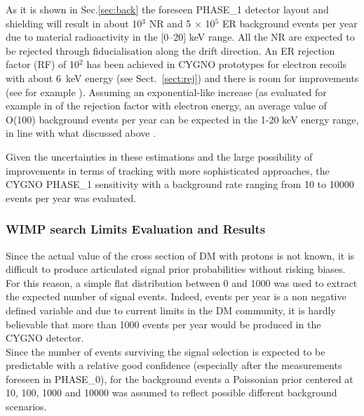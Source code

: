 \documentclass[physics,article,submit,moreauthors,pdftex]{Definitions/mdpi}
\begin{document}
As it is shown in Sec.\ref{sec:back} the foreseen PHASE\_1 detector layout and shielding will result in about 10$^3$ NR and 5 $\times$ 10$^5$ ER background events per year due to material radioactivity in the [0--20] keV range. All the NR are expected to be rejected through fiducialisation along the drift direction.  An ER rejection factor (RF) of 10$^2$ has been achieved in CYGNO prototypes for electron recoils with about 6~keV energy (see Sect.~\ref{sect:rej}) and there is room for improvements (see for example \cite{bib:recoil}). Assuming an exponential-like increase (as evaluated for example in \cite{bib:cygnus} of the rejection factor with electron energy, an average value of O(100) background events per year can be expected in the 1-20 keV energy range, in line with what discussed above \cite{Riffard:2016mgw,Phan:2015pda}. 

Given the uncertainties in these estimations and the large possibility of improvements in terms of tracking with more sophisticated approaches, the CYGNO PHASE\_1 sensitivity with a background rate ranging from 10 to 10000 events per year was evaluated. 



\subsubsection{WIMP search Limits Evaluation and Results} \label{sec:bayes}

Since the actual value of the cross section of DM with protons is not known, it is difficult to produce articulated signal prior probabilities without risking biases. For this reason, a simple flat distribution between 0 and 1000 was used to extract the expected number of signal events. Indeed, events per year is a non negative defined variable and due to current limits in the DM community, it is hardly believable that more than 1000 events per year would be produced in the CYGNO detector.\\
Since the number of events surviving the signal selection is expected to be predictable with a relative good confidence (especially after the measurements foreseen in PHASE\_0), for the  background events  a Poissonian prior centered at 10, 100, 1000 and 10000 was assumed to reflect possible different background scenarios.
\end{document}
